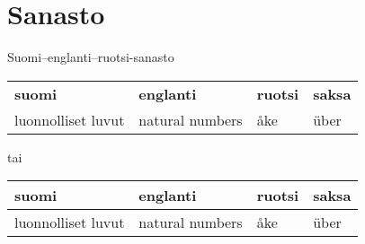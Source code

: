 \chapter{Sanasto}

Suomi–englanti–ruotsi-sanasto

\begin{tabular}{| l | l | l | l |}
	\textbf{suomi} & \textbf{englanti} & \textbf{ruotsi} & \textbf{saksa} \\
	luonnolliset luvut & natural numbers & åke & über \\
\end{tabular}

tai

\begin{tabular}{| l | l | l | l |}
	\hline
	\textbf{suomi} & \textbf{englanti} & \textbf{ruotsi} & \textbf{saksa} \\ \hline
	luonnolliset luvut & natural numbers & åke & über \\ \hline
	
\end{tabular}

